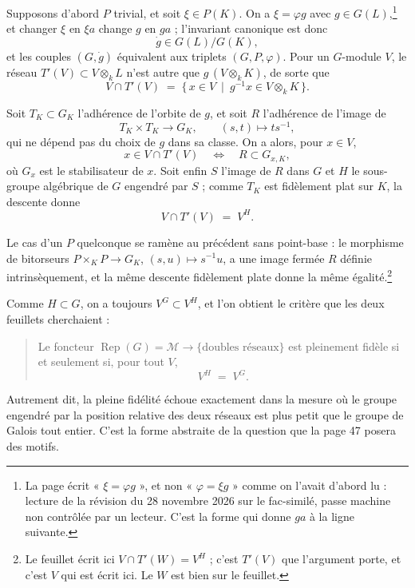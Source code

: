 \documentclass[11pt,a4paper]{article}
\begin{document}
Supposons d'abord $P$ trivial, et soit $\xi \in P(K)$. On a $\xi = \varphi g$
avec $g \in G(L)$,\footnote{La page écrit « $\xi = \varphi g$ », et non
« $\varphi = \xi g$ » comme on l'avait d'abord lu : lecture de la révision du
28 novembre 2026 sur le fac-similé, passe machine non contrôlée par un
lecteur. C'est la forme qui donne $g a$ à la ligne suivante.} et changer $\xi$ en $\xi a$ change $g$ en $ga$ ; l'invariant
canonique est donc
\[
\dot{g} \in G(L)/G(K) ,
\]
et les couples $(G, \dot{g})$ équivalent aux triplets $(G, P, \varphi)$. Pour un
$G$-module $V$, le réseau $T'(V) \subset V \otimes_{k} L$ n'est autre que
$g\,(V \otimes_{k} K)$, de sorte que
\[
V \cap T'(V) \;=\; \{\, x \in V \ \mid\ g^{-1} x \in V \otimes_{k} K \,\} .
\]

Soit $T_{K} \subset G_{K}$ l'adhérence de l'orbite de $g$, et soit $R$
l'adhérence de l'image de
\[
T_{K} \times T_{K} \longrightarrow G_{K} , \qquad (s,t) \longmapsto t s^{-1} ,
\]
qui ne dépend pas du choix de $g$ dans sa classe. On a alors, pour $x \in V$,
\[
x \in V \cap T'(V) \quad \Longleftrightarrow \quad R \subset G_{x,K} ,
\]
où $G_{x}$ est le stabilisateur de $x$. Soit enfin $S$ l'image de $R$ dans $G$ et
$H$ le sous-groupe algébrique de $G$ engendré par $S$ ; comme $T_{K}$ est
fidèlement plat sur $K$, la descente donne
\[
V \cap T'(V) \;=\; V^{H} .
\]

Le cas d'un $P$ quelconque se ramène au précédent sans point-base : le morphisme
de bitorseurs $P \times_{K} P \to G_{K}$, $(s,u) \mapsto s^{-1}u$, a une image
fermée $R$ définie intrinsèquement, et la même descente fidèlement plate donne
la même égalité.\footnote{Le feuillet écrit ici $V \cap T'(W) = V^{H}$ ; c'est
$T'(V)$ que l'argument porte, et c'est $V$ qui est écrit ici. Le $W$ est bien sur
le feuillet.}

Comme $H \subset G$, on a toujours $V^{G} \subset V^{H}$, et l'on obtient le
critère que les deux feuillets cherchaient :

\begin{quote}
Le foncteur $\operatorname{Rep}(G) = \mathcal{M} \to \{\text{doubles réseaux}\}$
est pleinement fidèle si et seulement si, pour tout $V$,
\[
V^{H} \;=\; V^{G} .
\]
\end{quote}

Autrement dit, la pleine fidélité échoue exactement dans la mesure où le groupe
engendré par la position relative des deux réseaux est plus petit que le groupe
de Galois tout entier. C'est la forme abstraite de la question que la page 47
posera des motifs.
\end{document}
